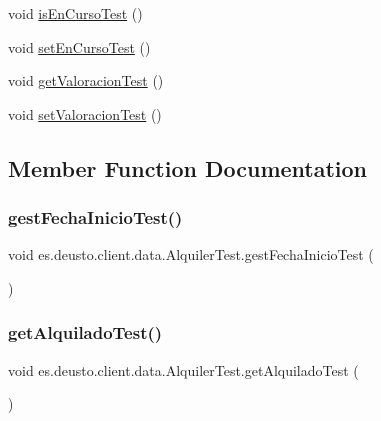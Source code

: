 \begin{DoxyCompactItemize}
\item 
void \mbox{\hyperlink{classes_1_1deusto_1_1client_1_1data_1_1_alquiler_test_a8abd20e1c46c0d37d251b3b5b6110cee}{is\+En\+Curso\+Test}} ()
\item 
void \mbox{\hyperlink{classes_1_1deusto_1_1client_1_1data_1_1_alquiler_test_a5ca36194d8d6a9837b12c0cf5c78b9eb}{set\+En\+Curso\+Test}} ()
\item 
void \mbox{\hyperlink{classes_1_1deusto_1_1client_1_1data_1_1_alquiler_test_a7fdf30c293fbfc8a08f6e3233fe69a08}{get\+Valoracion\+Test}} ()
\item 
void \mbox{\hyperlink{classes_1_1deusto_1_1client_1_1data_1_1_alquiler_test_aab27ba570ec581921dd72d26c0d8da6f}{set\+Valoracion\+Test}} ()
\end{DoxyCompactItemize}


\subsection{Member Function Documentation}
\mbox{\label{classes_1_1deusto_1_1client_1_1data_1_1_alquiler_test_a85465949ee1fb4afa44207614b860d89}} 
\subsubsection{\texorpdfstring{gestFechaInicioTest()}{gestFechaInicioTest()}}
{\footnotesize\ttfamily void es.\+deusto.\+client.\+data.\+Alquiler\+Test.\+gest\+Fecha\+Inicio\+Test (\begin{DoxyParamCaption}{ }\end{DoxyParamCaption})}

\mbox{\label{classes_1_1deusto_1_1client_1_1data_1_1_alquiler_test_a064b5d30a6c7a261613ed69b83f0808e}} 
\subsubsection{\texorpdfstring{getAlquiladoTest()}{getAlquiladoTest()}}
{\footnotesize\ttfamily void es.\+deusto.\+client.\+data.\+Alquiler\+Test.\+get\+Alquilado\+Test (\begin{DoxyParamCaption}{ }\end{DoxyParamCaption})}

